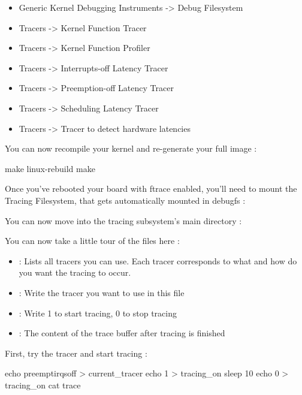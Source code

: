 \begin{itemize}
	\item Generic Kernel Debugging Instruments -> Debug Filesystem
	\item Tracers -> Kernel Function Tracer
	\item Tracers -> Kernel Function Profiler
	\item Tracers -> Interrupts-off Latency Tracer
	\item Tracers -> Preemption-off Latency Tracer
	\item Tracers -> Scheduling Latency Tracer
	\item Tracers -> Tracer to detect hardware latencies
\end{itemize}

You can now recompile your kernel and re-generate your full image :

\begin{bashinput}
make linux-rebuild
make
\end{bashinput}

Once you've rebooted your board with ftrace enabled, you'll need to mount the
Tracing Filesystem, that gets automatically mounted in debugfs :


You can now move into the tracing subsystem's main directory :


You can now take a little tour of the files here :

\begin{itemize}
	\item {} : Lists all tracers you can use. Each tracer
		corresponds to what and how do you want the tracing to occur.
	\item {} : Write the tracer you want to use in this file
	\item {} : Write 1 to start tracing, 0 to stop tracing
	\item {} : The content of the trace buffer after tracing is finished
\end{itemize}

First, try the  tracer and start tracing :

\begin{bashinput}
echo preemptirqsoff > current_tracer
echo 1 > tracing_on
sleep 10
echo 0 > tracing_on
cat trace
\end{bashinput}

